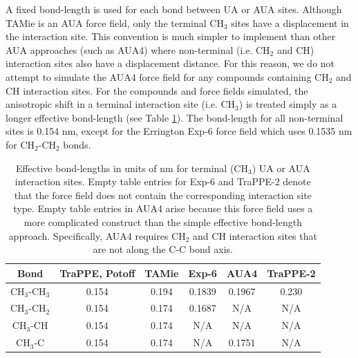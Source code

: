 \documentclass[journal=jctc,manuscript=article]{achemso}
\begin{document}
A fixed bond-length is used for each bond between UA or AUA sites. Although TAMie is an AUA force field, only the terminal CH$_3$ sites have a displacement in the interaction site. This convention is much simpler to implement than other AUA approaches (such as AUA4) where non-terminal (i.e. CH$_2$ and CH) interaction sites also have a displacement distance. For this reason, we do not attempt to simulate the AUA4 force field for any compounds containing CH$_2$ and CH interaction sites. For the compounds and force fields simulated, the anisotropic shift in a terminal interaction site (i.e. CH$_3$) is treated simply as a longer effective bond-length (see Table \ref{tab:bond-lengths}). The bond-length for all non-terminal sites is 0.154 nm, except for the Errington Exp-6 force field which uses 0.1535 nm for CH$_2$-CH$_2$ bonds.

\begin{table}[h!]
	\caption{Effective bond-lengths in units of nm for terminal (CH$_3$) UA or AUA interaction sites. Empty table entries for Exp-6 and TraPPE-2 denote that the force field does not contain the corresponding interaction site type. Empty table entries in AUA4 arise because this force field uses a more complicated construct than the simple effective bond-length approach. Specifically, AUA4 requires CH$_2$ and CH interaction sites that are not along the C-C bond axis.} \label{tab:bond-lengths}
	\begin{center}
		\begin{tabular}{|c|c|c|c|c|c|}
			\hline
			Bond & TraPPE, Potoff & TAMie & Exp-6 & AUA4 & TraPPE-2 \\ \hline
			CH$_3$-CH$_3$ & 0.154 & 0.194 & 0.1839 & 0.1967 & 0.230 \\ 
			CH$_3$-CH$_2$ & 0.154 & 0.174 & 0.1687 & N/A & N/A \\ 
			CH$_3$-CH & 0.154 & 0.174 & N/A & N/A & N/A \\
			CH$_3$-C & 0.154 & 0.174 & N/A & 0.1751 & N/A \\
			\hline
		\end{tabular}
	\end{center} 
\end{table}
\end{document}
